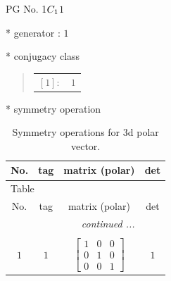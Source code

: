 \documentclass[fleqn,8pt]{jsarticle}
\begin{document}
\setcounter{MaxMatrixCols}{32}

\renewcommand{\tablename}{Table~}
\renewcommand{\figurename}{Figure~}
\begin{center}
\LARGE
PG No. 1\quad$C_{\rm 1}$\quad$1$\quad[ triclinic ]
\end{center}

* generator : $1$

* conjugacy class
\begin{quote}
\begin{tabular}{rl}
$ [1]: $ & $ 1 $
\end{tabular}
\end{quote}

* symmetry operation
\renewcommand{\arraystretch}{1.3}
\begin{longtable}{cccc}
\caption{Symmetry operations for 3d polar vector.}
 \\
 \hline \hline
No. & tag & matrix (polar) & det \\ \hline \endfirsthead

\multicolumn{3}{l}{\tablename\ \thetable{}} \\
 \hline \hline
No. & tag & matrix (polar) & det \\ \hline \endhead

 \hline \hline
\multicolumn{3}{r}{\footnotesize\it continued ...} \\ \endfoot

 \hline \hline
\multicolumn{3}{r}{} \\ \endlastfoot

$ 1 $ & $ 1 $ & $ \begin{bmatrix} 1 & 0 & 0 \\ 0 & 1 & 0 \\ 0 & 0 & 1 \end{bmatrix} $ & $ 1 $ \\
\end{longtable}
\end{document}
